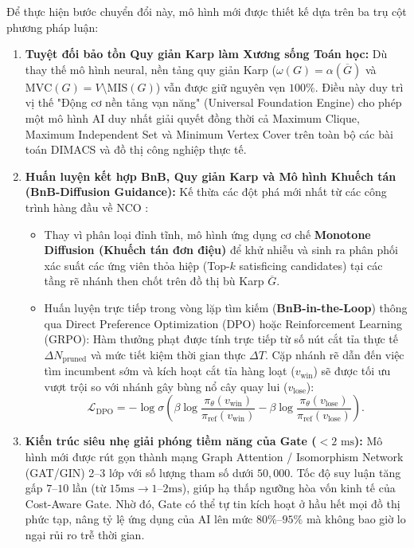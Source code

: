 \documentclass[11pt,a4paper]{article}
\begin{document}
Để thực hiện bước chuyển đổi này, mô hình mới được thiết kế dựa trên ba trụ cột phương pháp luận:
\begin{enumerate}[leftmargin=*]
    \item \textbf{Tuyệt đối bảo tồn Quy giản Karp làm Xương sống Toán học:} Dù thay thế mô hình neural, nền tảng quy giản Karp ($\omega(G) = \alpha(\overline{G})$ và $\text{MVC}(G) = V \setminus \text{MIS}(G)$) vẫn được giữ nguyên vẹn $100\%$. Điều này duy trì vị thế "Động cơ nền tảng vạn năng" (Universal Foundation Engine) cho phép một mô hình AI duy nhất giải quyết đồng thời cả Maximum Clique, Maximum Independent Set và Minimum Vertex Cover trên toàn bộ các bài toán DIMACS và đồ thị công nghiệp thực tế.
    \item \textbf{Huấn luyện kết hợp BnB, Quy giản Karp và Mô hình Khuếch tán (BnB-Diffusion Guidance):} Kế thừa các đột phá mới nhất từ các công trình hàng đầu về NCO \citep{fang2026asap}:
    \begin{itemize}[nosep]
        \item Thay vì phân loại đỉnh tĩnh, mô hình ứng dụng cơ chế \textbf{Monotone Diffusion (Khuếch tán đơn điệu)} để khử nhiễu và sinh ra phân phối xác suất các ứng viên thỏa hiệp (Top-$k$ satisficing candidates) tại các tầng rẽ nhánh then chốt trên đồ thị bù Karp $\overline{G}$.
        \item Huấn luyện trực tiếp trong vòng lặp tìm kiếm (\textbf{BnB-in-the-Loop}) thông qua Direct Preference Optimization (DPO) \citep{rafailov2024dpo} hoặc Reinforcement Learning (GRPO): Hàm thưởng phạt được tính trực tiếp từ số nút cắt tỉa thực tế $\Delta N_{\text{pruned}}$ và mức tiết kiệm thời gian thực $\Delta T$. Cặp nhánh rẽ dẫn đến việc tìm incumbent sớm và kích hoạt cắt tỉa hàng loạt ($v_{\text{win}}$) sẽ được tối ưu vượt trội so với nhánh gây bùng nổ cây quay lui ($v_{\text{lose}}$):
        \begin{equation}
        \mathcal{L}_{\mathrm{DPO}} = -\log \sigma \left( \beta \log \frac{\pi_\theta(v_{\text{win}})}{\pi_{\mathrm{ref}}(v_{\text{win}})} - \beta \log \frac{\pi_\theta(v_{\text{lose}})}{\pi_{\mathrm{ref}}(v_{\text{lose}})} \right).
        \end{equation}
    \end{itemize}
    \item \textbf{Kiến trúc siêu nhẹ giải phóng tiềm năng của Gate ($< 2\text{ ms}$):} Mô hình mới được rút gọn thành mạng Graph Attention / Isomorphism Network (GAT/GIN) 2--3 lớp với số lượng tham số dưới $50,000$. Tốc độ suy luận tăng gấp $7\text{--}10$ lần (từ $15\text{ms} \to 1\text{--}2\text{ms}$), giúp hạ thấp ngưỡng hòa vốn kinh tế của Cost-Aware Gate. Nhờ đó, Gate có thể tự tin kích hoạt ở hầu hết mọi đồ thị phức tạp, nâng tỷ lệ ứng dụng của AI lên mức \textbf{$80\%\text{--}95\%$} mà không bao giờ lo ngại rủi ro trễ thời gian.
\end{enumerate}
\end{document}
